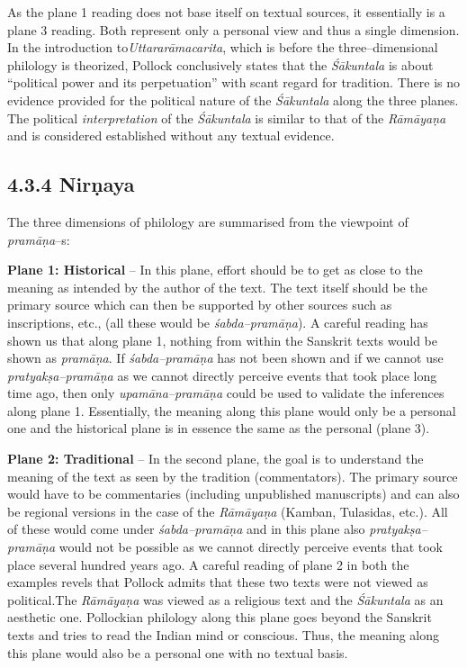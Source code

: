 As the plane 1 reading does not base itself on textual sources, it essentially is a plane 3 reading. Both represent only a personal view and thus a single dimension. In the introduction to\textit{Uttararāmacarita}, which is before the three–dimensional philology is theorized, Pollock conclusively states that the \textit{Śākuntala }is about “political power and its perpetuation” with scant regard for tradition. There is no evidence provided for the political nature of the \textit{Śākuntala} along the three planes. The political \textit{interpretation} of the \textit{Śākuntala }is similar to that of the \textit{Rāmāyaṇa} and is considered established without any textual evidence.


\subsection*{4.3.4 Nirṇaya}

The three dimensions of philology are summarised from the viewpoint of \textit{pramāṇa}–s:

\textbf{Plane 1: Historical} – In this plane, effort should be to get as close to the meaning as intended by the author of the text. The text itself should be the primary source which can then be supported by other sources such as inscriptions, etc., (all these would be \textit{śabda–pramāṇa}). A careful reading has shown us that along plane 1, nothing from within the Sanskrit texts would be shown as \textit{pramāṇa}. If \textit{śabda–pramāṇa} has not been shown and if we cannot use \textit{pratyakṣa–pramāṇa} as we cannot directly perceive events that took place long time ago, then only\textit{ upamāna–pramāṇa} could be used to validate the inferences along plane 1. Essentially, the meaning along this plane would only be a personal one and the historical plane is in essence the same as the personal (plane 3).

\textbf{Plane 2: Traditional} – In the second plane, the goal is to understand the meaning of the text as seen by the tradition (commentators). The primary source would have to be commentaries (including unpublished manuscripts) and can also be regional versions in the case of the \textit{Rāmāyaṇa }(Kamban, Tulasidas, etc.). All of these would come under \textit{śabda–pramāṇa }and in this plane also \textit{pratyakṣa–pramāṇa} would not be possible as we cannot directly perceive events that took place several hundred years ago. A careful reading of plane 2 in both the examples revels that Pollock admits that these two texts were not viewed as political.The \textit{Rāmāyaṇa }was viewed as a religious text and the \textit{Śākuntala} as an aesthetic one. Pollockian philology along this plane goes beyond the Sanskrit texts and tries to read the Indian mind or conscious. Thus, the meaning along this plane would also be a personal one with no textual basis.


